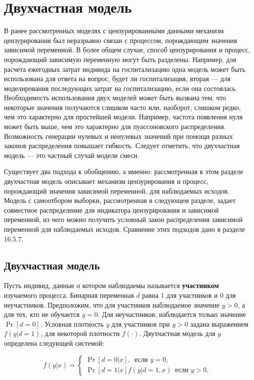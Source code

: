 \section{Двухчастная модель}

В ранее рассмотренных моделях с цензурированными данными механизм цензурирования был неразрывно связан с процессом, порождающим значения зависимой переменной. В более общем случае, способ цензурирования и процесс, порождающий зависимую переменную могут быть разделены. Например, для расчета ежегодных затрат индивида на госпитализацию одна модель может быть использована для ответа на вопрос, будет ли госпитализация, вторая --- для моделирования последующих затрат на госпитализацию, если она состоялась. Необходимость использования двух моделей может быть вызвана тем, что некоторые значения получаются слишком часто или, наоборот, слишком редко, чем это характерно для простейшей модели. Например, частота появления нуля может быть выше, чем это характерно для пуассоновского распределения. Возможность генерации нулевых и ненулевых значений при помощи разных законов распределения повышает гибкость. Следует отметить, что двухчастная модель --- это частный случай модели смеси.

Существует два подхода к обобщению, а именно: рассмотренная в этом разделе двухчастная модель описывает механизм цензурирования и процесс, порождающий значения зависимой переменной, для наблюдаемых исходов. Модель с самоотбором выборки, рассмотренная в следующем разделе, задает совместное распределение для индикатора цензурирования и зависимой переменной, из чего можно получить условный закон распределения зависимой переменной для наблюдаемых исходов.  Сравнение этих подходов дано в разделе 16.5.7.

\subsection{Двухчастная модель}

Пусть индивид, данные о котором наблюдаемы называется \textbf{участником} изучаемого процесса. Бинарная переменная $d$ равна 1 для участников и 0 для неучастников. Предположим, что для участников наблюдаемое значение $y>0$, а для тех, кто не обучается $y=0$. Для неучастников, наблюдается только значение $\Pr[ d=0]$. Условная плотность $y$ для участников при $y>0$ задана выражением $f(y|d=1)$, для некоторой плотности $f(\cdot )$. Двухчастная модель для $y$ определена следующей системой:

\begin{equation}
f(y|x)=
\begin{cases}
\Pr[d=0|x], \, \text{ если } y=0, \\
\Pr[d=1|x]f(y|d=1,x) \, \text{ если } y>0.
\end{cases}  
\end{equation}

